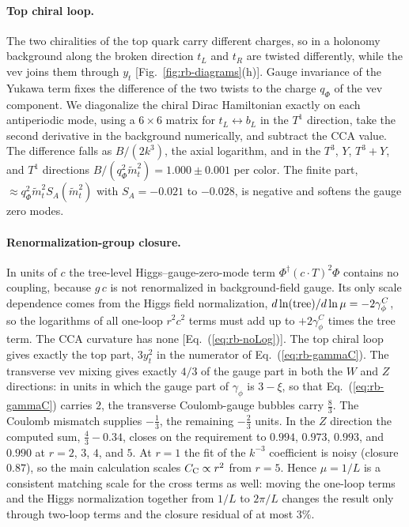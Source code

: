\paragraph{Top chiral loop.}
The two chiralities of the top quark carry different charges, so in a holonomy background along the broken direction $t_L$ and $t_R$ are twisted differently, while the vev joins them through $y_t$ [Fig.~\ref{fig:rb-diagrams}(h)].
Gauge invariance of the Yukawa term fixes the difference of the two twists to the charge $q_\Phi$ of the vev component.
We diagonalize the chiral Dirac Hamiltonian exactly on each antiperiodic mode, using a $6\times6$ matrix for $t_L\leftrightarrow b_L$ in the $T^1$ direction, take the second derivative in the background numerically, and subtract the CCA value.
The difference falls as $B/(2k^3)$, the axial logarithm, and in the $T^3$, $Y$, $T^3+Y$, and $T^1$ directions $B/(q_\Phi^2\tilde m_t^2)=1.000\pm0.001$ per color. %
The finite part, $\approx q_\Phi^2\tilde m_t^2S_A(\tilde m_t^2)$ with $S_A=-0.021$ to $-0.028$, is negative and softens the gauge zero modes. %

\paragraph{Renormalization-group closure.}
In units of $c$ the tree-level Higgs--gauge-zero-mode term $\Phi^\dagger(c\cdot T)^2\Phi$ contains no coupling, because $g\,c$ is not renormalized in background-field gauge.
Its only scale dependence comes from the Higgs field normalization, $d\ln({\rm tree})/d\ln\mu=-2\gamma_\phi^C$, so the logarithms of all one-loop $r^2c^2$ terms must add up to $+2\gamma_\phi^C$ times the tree term.
The CCA curvature has none [Eq.~(\ref{eq:rb-noLog})].
The top chiral loop gives exactly the top part, $3y_t^2$ in the numerator of Eq.~(\ref{eq:rb-gammaC}).
The transverse vev mixing gives exactly $4/3$ of the gauge part in both the $W$ and $Z$ directions: in units in which the gauge part of $\gamma_\phi$ is $3-\xi$, so that Eq.~(\ref{eq:rb-gammaC}) carries $2$, the transverse Coulomb-gauge bubbles carry $\frac83$.
The Coulomb mismatch supplies $-\frac13$, the remaining $-\frac23$ units.
In the $Z$ direction the computed sum, $\frac43-0.34$, closes on the requirement to $0.994$, $0.973$, $0.993$, and $0.990$ at $r=2$, $3$, $4$, and $5$. %
At $r=1$ the fit of the $k^{-3}$ coefficient is noisy (closure $0.87$), so the main calculation scales $C_{\rm C}\propto r^2$ from $r=5$. %
Hence $\mu=1/L$ is a consistent matching scale for the cross terms as well: moving the one-loop terms and the Higgs normalization together from $1/L$ to $2\pi/L$ changes the result only through two-loop terms and the closure residual of at most $3\%$. %

